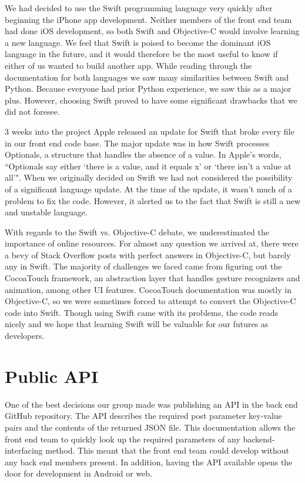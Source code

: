 \documentclass[12pt]{article}
\begin{document}
We had decided to use the Swift programming language very quickly after beginning the iPhone app development.
Neither members of the front end team had done iOS development, so both Swift and Objective-C would involve learning a new language. 
We feel that Swift is poised to become the dominant iOS language in the future, and it would therefore be the most useful to know if either of us wanted to build another app. 
While reading through the documentation for both languages we saw many similarities between Swift and Python. 
Because everyone had prior Python experience, we saw this as a major plus. 
However, choosing Swift proved to have some significant drawbacks that we did not foresee. 

3 weeks into the project Apple released an update for Swift that broke every file in our front end code base. 
The major update was in how Swift processes Optionals, a structure that handles the absence of a value. 
In Apple's words, ``Optionals say either `there is a value, and it equals x' or `there isn't a value at all'". 
When we originally decided on Swift we had not considered the possibility of a significant language update. 
At the time of the update, it wasn't much of a problem to fix the code. 
However, it alerted us to the fact that Swift is still a new and unstable language. 

With regards to the Swift vs. Objective-C debate, we underestimated the importance of online resources. 
For almost any question we arrived at, there were a bevy of Stack Overflow posts with perfect answers in Objective-C, but barely any in Swift. 
The majority of challenges we faced came from figuring out the CocoaTouch framework, an abstraction layer that handles gesture recognizers and animation, among other UI features. 
CocoaTouch documentation was mostly in Objective-C, so we were sometimes forced to attempt to convert the Objective-C code into Swift. 
Though using Swift came with its problems, the code reads nicely and we hope that learning Swift will be valuable for our futures as developers.

\section{Public API}

One of the best decisions our group made was publishing an API in the back end GitHub repository. 
The API describes the required post parameter key-value pairs and the contents of the returned JSON file. 
This documentation allows the front end team to quickly look up the required parameters of any backend-interfacing method. 
This meant that the front end team could develop without any back end members present.
In addition, having the API available opens the door for development in Android or web.
\end{document}
